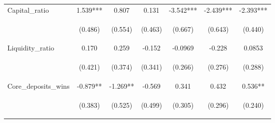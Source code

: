 \documentclass[]{article}
\begin{document}
\begin{center}
\begin{tabular}{lcccccc}
Capital\_ratio & 1.539*** & 0.807 & 0.131 & -3.542*** & -2.439*** & -2.393*** \\
\vspace{4pt} & \begin{footnotesize}(0.486)\end{footnotesize} & \begin{footnotesize}(0.554)\end{footnotesize} & \begin{footnotesize}(0.463)\end{footnotesize} & \begin{footnotesize}(0.667)\end{footnotesize} & \begin{footnotesize}(0.643)\end{footnotesize} & \begin{footnotesize}(0.440)\end{footnotesize} \\
Liquidity\_ratio & 0.170 & 0.259 & -0.152 & -0.0969 & -0.228 & 0.0853 \\
\vspace{4pt} & \begin{footnotesize}(0.421)\end{footnotesize} & \begin{footnotesize}(0.374)\end{footnotesize} & \begin{footnotesize}(0.341)\end{footnotesize} & \begin{footnotesize}(0.266)\end{footnotesize} & \begin{footnotesize}(0.276)\end{footnotesize} & \begin{footnotesize}(0.288)\end{footnotesize} \\
Core\_deposits\_wins & -0.879** & -1.269** & -0.569 & 0.341 & 0.432 & 0.536** \\
\vspace{4pt} & \begin{footnotesize}(0.383)\end{footnotesize} & \begin{footnotesize}(0.525)\end{footnotesize} & \begin{footnotesize}(0.499)\end{footnotesize} & \begin{footnotesize}(0.305)\end{footnotesize} & \begin{footnotesize}(0.296)\end{footnotesize} & \begin{footnotesize}(0.240)\end{footnotesize} \\

\end{tabular}
\end{center}
\end{document}
